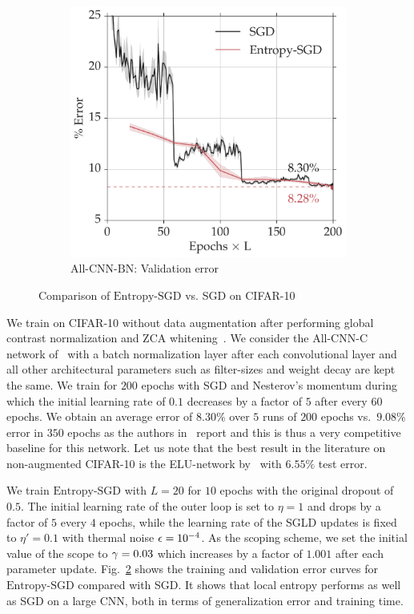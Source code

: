 \documentclass[10pt]{article}
\newcommand{\entropysgd}{\mathrm{Entropy}\textrm{-}\mathrm{SGD}}
\newcommand{\allcnn}{\textrm{All-CNN-BN}}
\newcommand{\pc}[2]{{\color{ForestGreen}#1}\marginpar{\tiny\noindent{\raggedright{\color{Sienna}[PC]}\color{Sienna}{#2} \par}}}
\begin{document}
\begin{figure}[htp!]
\begin{subfigure}[b]{0.4\textwidth}
        \includegraphics[width=\textwidth]{allcnn_valid.pdf}
        \caption{\small $\allcnn$: Validation error}
        \label{fig:allcnn_valid}
    \end{subfigure}
\caption{\small Comparison of $\entropysgd$ vs. SGD on CIFAR-10}
\label{fig:allcnn}
\end{figure}

We train on CIFAR-10 without data augmentation after performing global contrast normalization and ZCA whitening~\citep{goodfellow2013maxout}. We consider the All-CNN-C network of~\citet{springenberg2014striving} with a batch normalization layer after each convolutional layer and all other architectural parameters such as filter-sizes and weight decay are kept the same. We train for $200$ epochs with SGD and Nesterov's momentum during which the initial learning rate of $0.1$ decreases by a factor of $5$ after every $60$ epochs. We obtain an average error of \pc{$8.30\%$}{std-dev?} over $5$ runs of $200$ epochs vs.\ $9.08\%$ error in $350$ epochs as the authors in~\citet{springenberg2014striving} report and this is thus a very competitive baseline for this network. \pc{Let us note that the best result in the literature on non-augmented CIFAR-10 is the ELU-network by~\citet{clevert2015fast} with $6.55\%$ test error.}{maybe remove?}

We train $\entropysgd$ with $L = 20$ for $10$ epochs with the original dropout of $0.5$. The initial learning rate of the outer loop is set to $\eta = 1$ and drops by a factor of $5$ every $4$ epochs, while the learning rate of the SGLD updates is fixed to $\eta' = 0.1$ with thermal noise $\epsilon = 10^{-4}$. As the scoping scheme, we set the initial value of the scope to $\gamma = 0.03$ which increases by a factor of $1.001$ after each parameter update.
%
Fig.~\ref{fig:allcnn} shows the training and validation error curves for $\entropysgd$ compared with SGD. It shows that local entropy performs as well as SGD on a large CNN, both in terms of generalization error and training time.
\end{document}
